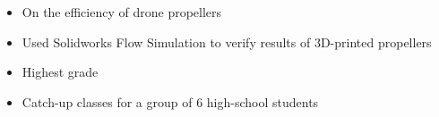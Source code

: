 \documentclass[10pt,a4paper,normalphoto]{altacv}
\begin{document}
\divider

\begin{itemize}
\item On the efficiency of drone propellers
\item Used Solidworks Flow Simulation to verify results of 3D-printed propellers
\item Highest grade
\end{itemize}

\divider

\begin{itemize}
\item Catch-up classes for a group of 6 high-school students
\end{itemize}
\clearpage
\end{document}
